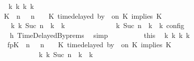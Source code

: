 \begin{isabellebody}
\ \ \ \ \ \ \ \ \isamarkupfalse%
\ \isamarkupfalse%
\ {\isacartoucheopen}{\isasymexists}{\isasymGamma}\isactrlsub k\ {\isasymPsi}\isactrlsub k\ {\isasymPhi}\isactrlsub k\ k{\isachardot}\isanewline
\ \ \ \ \ \ \ \ \ \ {\isacharparenleft}{\isacharparenleft}{\isacharparenleft}{\isacharparenleft}K\ {\isasymnot}{\isasymUp}\ n{\isacharparenright}\ {\isacharhash}\ {\isasymGamma}{\isacharparenright}{\isacharcomma}\ n\ {\isasymturnstile}\ {\isasymPsi}\ {\isasymtriangleright}\ {\isacharparenleft}{\isacharparenleft}K\ time{\isacharminus}delayed\ by\ {\isasymdelta}{\isasymtau}\ on\ K\ implies\ K\ {\isacharhash}\ {\isasymPhi}{\isacharparenright}{\isacharparenright}\isanewline
\ \ \ \ \ \ \ \ \ \ \ \ {\isasymhookrightarrow}\isactrlbsup k\isactrlesup \ {\isacharparenleft}{\isasymGamma}\isactrlsub k{\isacharcomma}\ Suc\ n\ {\isasymturnstile}\ {\isasymPsi}\isactrlsub k\ {\isasymtriangleright}\ {\isasymPhi}\isactrlsub k{\isacharparenright}{\isacharparenright}\isanewline
\ \ \ \ \ \ \ \ \ \ {\isasymand}\ {\isasymrho}\ {\isasymin}\ {\isasymlbrakk}\ {\isasymGamma}\isactrlsub k{\isacharcomma}\ Suc\ n\ {\isasymturnstile}\ {\isasymPsi}\isactrlsub k\ {\isasymtriangleright}\ {\isasymPhi}\isactrlsub k\ {\isasymrbrakk}\isactrlsub c\isactrlsub o\isactrlsub n\isactrlsub f\isactrlsub i\isactrlsub g{\isacartoucheclose}\isanewline
\ \ \ \ \ \ \ \ \ \ \isamarkupfalse%
\ h{}\ TimeDelayedBy{\isachardot}prems\ \isamarkupfalse%
\ simp\isanewline
\ \ \ \ \ \ \ \ \isamarkupfalse%
\ this\ \isamarkupfalse%
\ {\isasymGamma}\isactrlsub k\ {\isasymPsi}\isactrlsub k\ {\isasymPhi}\isactrlsub k\ k\isanewline
\ \ \ \ \ \ \ \ \ \ \ fp{\isacharcolon}{\isacartoucheopen}{\isacharparenleft}{\isacharparenleft}{\isacharparenleft}K\ {\isasymnot}{\isasymUp}\ n{\isacharparenright}\ {\isacharhash}\ {\isasymGamma}{\isacharparenright}{\isacharcomma}\ n\ {\isasymturnstile}\ {\isasymPsi}\ {\isasymtriangleright}\ {\isacharparenleft}{\isacharparenleft}K\ time{\isacharminus}delayed\ by\ {\isasymdelta}{\isasymtau}\ on\ K\ implies\ K\ {\isacharhash}\ {\isasymPhi}{\isacharparenright}{\isacharparenright}\isanewline
\ \ \ \ \ \ \ \ \ \ \ \ \ \ \ \ \ \ \ \ {\isasymhookrightarrow}\isactrlbsup k\isactrlesup \ {\isacharparenleft}{\isasymGamma}\isactrlsub k{\isacharcomma}\ Suc\ n\ {\isasymturnstile}\ {\isasymPsi}\isactrlsub k\ {\isasymtriangleright}\ {\isasymPhi}\isactrlsub k{\isacharparenright}{\isacartoucheclose}\isanewline

\end{isabellebody}
